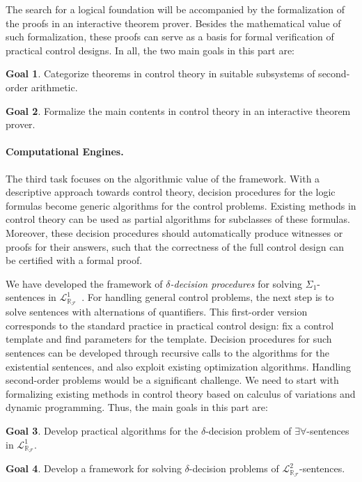 \documentclass[10pt]{article}
\newcommand{\lrf}{\mathcal{L}_{\mathbb{R}_{\mathcal{F}}}}
\theoremstyle{definition}
\newtheorem{goal}{Goal}
\begin{document}
The search for a logical foundation will be accompanied by the formalization of the proofs in an interactive theorem prover. Besides the mathematical value of such formalization, these proofs can serve as a basis for formal verification of practical control designs. In all, the two main goals in this part are:
\begin{goal}
Categorize theorems in control theory in suitable subsystems of second-order arithmetic. 
\end{goal}
\begin{goal}
Formalize the main contents in control theory in an interactive theorem prover.  
\end{goal}

\paragraph{Computational Engines.}

The third task focuses on the algorithmic value of the framework. With a descriptive approach towards control theory, decision procedures for the logic formulas become generic algorithms for the control problems. Existing methods in control theory can be used as partial algorithms for subclasses of these formulas. Moreover, these decision procedures should automatically produce witnesses or proofs for their answers, such that the correctness of the full control design can be certified with a formal proof.

We have developed the framework of {\em $\delta$-decision procedures} for solving $\Sigma_1$-sentences in $\lrf^1$~\cite{DBLP:conf/cade/GaoAC12}. For handling general control problems, the next step is to solve sentences with alternations of quantifiers. This first-order version corresponds to the standard practice in practical control design: fix a control template and find parameters for the template. Decision procedures for such sentences can be developed through recursive calls to the algorithms for the existential sentences, and also exploit existing optimization algorithms. Handling second-order problems would be a significant challenge. We need to start with formalizing existing methods in control theory based on calculus of variations and dynamic programming. Thus, the main goals in this part are:
\begin{goal}
Develop practical algorithms for the $\delta$-decision problem of $\exists\forall$-sentences in $\lrf^1$.
\end{goal}
\begin{goal}
Develop a framework for solving $\delta$-decision problems of $\lrf^2$-sentences.
\end{goal}
\end{document}
